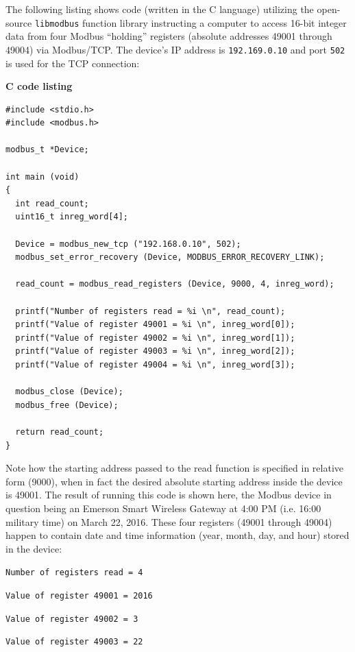 \filbreak

The following listing shows code (written in the C language) utilizing the open-source \texttt{libmodbus} function library instructing a computer to access 16-bit integer data from four Modbus ``holding'' registers (absolute addresses 49001 through 49004) via Modbus/TCP.  The device's IP address is \texttt{192.169.0.10} and port \texttt{502} is used for the TCP connection:

\vskip 10pt

\textbf{C code listing} 

\lstset{language=C}
\begin{lstlisting}
#include <stdio.h>
#include <modbus.h>

modbus_t *Device;

int main (void)
{
  int read_count;
  uint16_t inreg_word[4];

  Device = modbus_new_tcp ("192.168.0.10", 502);
  modbus_set_error_recovery (Device, MODBUS_ERROR_RECOVERY_LINK);

  read_count = modbus_read_registers (Device, 9000, 4, inreg_word);

  printf("Number of registers read = %i \n", read_count);
  printf("Value of register 49001 = %i \n", inreg_word[0]);
  printf("Value of register 49002 = %i \n", inreg_word[1]);
  printf("Value of register 49003 = %i \n", inreg_word[2]);
  printf("Value of register 49004 = %i \n", inreg_word[3]);

  modbus_close (Device);
  modbus_free (Device);

  return read_count;
}
\end{lstlisting}

\vskip 10pt

Note how the starting address passed to the read function is specified in relative form (9000), when in fact the desired absolute starting address inside the device is 49001.  The result of running this code is shown here, the Modbus device in question being an Emerson Smart Wireless Gateway at 4:00 PM (i.e. 16:00 military time) on March 22, 2016.  These four registers (49001 through 49004) happen to contain date and time information (year, month, day, and hour) stored in the device:

\vskip 10pt

\texttt{Number of registers read = 4}

\texttt{Value of register 49001 = 2016}

\texttt{Value of register 49002 = 3}

\texttt{Value of register 49003 = 22}

